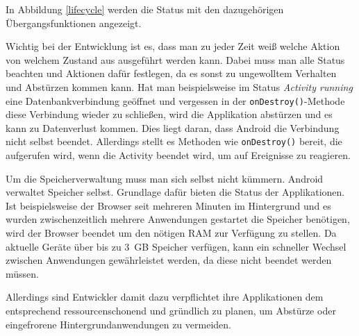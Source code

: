 In Abbildung \ref{lifecycle} werden die Status mit den dazugehörigen Übergangsfunktionen angezeigt.

Wichtig bei der Entwicklung ist es, dass man zu jeder Zeit weiß welche Aktion von welchem Zustand aus ausgeführt werden kann. Dabei muss man alle Status beachten und Aktionen dafür festlegen, da es sonst zu ungewolltem Verhalten und Abstürzen kommen kann. Hat man beispielsweise im Status \emph{Activity running} eine Datenbankverbindung geöffnet und vergessen in der \verb+onDestroy()+-Methode diese Verbindung wieder zu schließen, wird die Applikation abstürzen und es kann zu Datenverlust kommen. Dies liegt daran, dass Android die Verbindung nicht selbst beendet. Allerdings stellt es Methoden wie \verb+onDestroy()+ bereit, die aufgerufen wird, wenn die Activity beendet wird, um auf Ereignisse zu reagieren.

Um die Speicherverwaltung muss man sich selbst nicht kümmern. Android verwaltet Speicher selbst. Grundlage dafür bieten die Status der Applikationen. Ist beispielsweise der Browser seit mehreren Minuten im Hintergrund und es wurden zwischenzeitlich mehrere Anwendungen gestartet die Speicher benötigen, wird der Browser beendet um den nötigen RAM zur Verfügung zu stellen. Da aktuelle Geräte über bis zu \SI{3}{GB} Speicher verfügen, kann ein schneller Wechsel zwischen Anwendungen gewährleistet werden, da diese nicht beendet werden müssen.

Allerdings sind Entwickler damit dazu verpflichtet ihre Applikationen dem entsprechend ressourcenschonend und gründlich zu planen, um Abstürze oder eingefrorene Hintergrundanwendungen zu vermeiden.